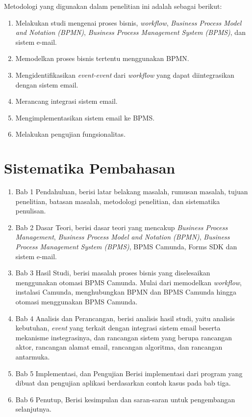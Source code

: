 Metodologi yang digunakan dalam penelitian ini adalah sebagai berikut:
\begin{enumerate}
	\item Melakukan studi mengenai proses bisnis, \textit{workflow}, \textit{Business Process Model and Notation (BPMN)}, \textit{Business Process Management System (BPMS)}, dan sistem e-mail. 
	\item Memodelkan proses bisnis tertentu menggunakan BPMN.
	\item Mengidentifikasikan \textit{event-event} dari \textit{workflow} yang dapat diintegrasikan dengan sistem email.
	\item Merancang integrasi sistem email.
	\item Mengimplementasikan sistem email ke BPMS.
	\item Melakukan pengujian fungsionalitas.
\end{enumerate}




\section{Sistematika Pembahasan}
\label{sec:sispem}

\begin{enumerate}
	\item Bab 1 Pendahuluan, berisi latar belakang masalah, rumusan masalah, tujuan penelitian, batasan masalah, metodologi penelitian, dan sistematika penulisan.
	\item Bab 2 Dasar Teori, berisi dasar teori yang mencakup \textit{Business Process Management}, \textit{Business Process Model and Notation (BPMN)}, \textit{Business Process Management System (BPMS)}, BPMS Camunda, Forms SDK dan sistem e-mail.
	\item Bab 3 Hasil Studi, berisi masalah proses bisnis yang diselesaikan menggunakan otomasi BPMS Camunda. Mulai dari memodelkan \textit{workflow}, instalasi Camunda, menghubungkan BPMN dan BPMS Camunda hingga otomasi menggunakan BPMS Camunda.
	\item Bab 4 Analisis dan Perancangan, berisi analisis hasil studi, yaitu analisis kebutuhan, \textit{event} yang terkait dengan integrasi sistem email beserta mekanisme instegrasinya, dan rancangan sistem yang berupa rancangan aktor, rancangan alamat email, rancangan algoritma, dan rancangan antarmuka.
	\item Bab 5 Implementasi, dan Pengujian Berisi implementasi dari program yang dibuat dan pengujian aplikasi berdasarkan contoh kasus pada bab tiga.
	\item Bab 6 Penutup, Berisi kesimpulan dan saran-saran untuk pengembangan selanjutnya.
\end{enumerate}


